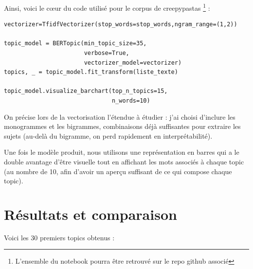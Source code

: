 \documentclass[a4paper,12pt,onecolumn,oneside]{article}
\begin{document}
Ainsi, voici le cœur du code utilisé pour le corpus de creepypastas \footnote{L'ensemble du notebook pourra être retrouvé sur le repo github associé} :

\begin{verbatim}
vectorizer=TfidfVectorizer(stop_words=stop_words,ngram_range=(1,2))

topic_model = BERTopic(min_topic_size=35, 
                       verbose=True, 
                       vectorizer_model=vectorizer)
topics, _ = topic_model.fit_transform(liste_texte)

topic_model.visualize_barchart(top_n_topics=15,
                               n_words=10)
\end{verbatim}

On précise lors de la vectorisation l'étendue à étudier : j'ai choisi d'inclure les monogrammes et les bigrammes, combinaisons déjà suffisantes pour extraire les sujets (au-delà du bigramme, on perd rapidement en interprétabilité).

Une fois le modèle produit, nous utilisons une représentation en barres qui a le double avantage d'être visuelle tout en affichant les mots associés à chaque topic (au nombre de 10, afin d'avoir un aperçu suffisant de ce qui compose chaque topic).

\section{Résultats et comparaison}
Voici les 30 premiers topics obtenus :
\end{document}
